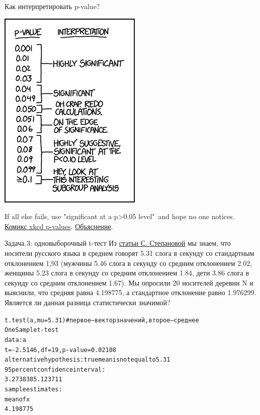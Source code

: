 \begin{frame}{Как интерпретировать p-value?}
\begin{center}
\includegraphics[width=0.45\linewidth]{ifall.png}
\end{center}
\vspace{-5mm}
If all else fails, use "significant at a p>0.05 level"\ and hope no one notices.
\\
\href{https://xkcd.com/1478/}{\alert{Комикс xkcd p-values}}. \href{http://www.explainxkcd.com/wiki/index.php/P-Values}{\alert{Объяснение}}.
\end{frame}
\begin{frame}{Задача 3: одновыборочный t-тест}
Из \href{https://www.internationalphoneticassociation.org/icphs-proceedings/ICPhS2011/OnlineProceedings/RegularSession/Stepanova/Stepanova.pdf}{\alert{статьи С. Степановой}} мы знаем, что носители русского языка в среднем говорят 5.31 слога в секунду со стандартным отклонением 1,93 (мужчины 5.46 слога в секунду  со средним отклонением 2.02, женщины 5.23 слога в секунду  со средним отклонением 1.84, дети 3.86 слога в секунду со средним отклонением 1.67). Мы опросили 20 носителей деревни N и выяснили, что средняя равна 4.198775, а стандартное отклонение равно 1.976299. Является ли данная разница статистически значимой?
\vfill
\scriptsize
\begin{alltt}
\alert{t.test(a, mu = 5.31)} \hfill \# первое — вектор значений, второе — среднее\medskip\\
One Sample t-test\\
data:  a\\
\alert{t = -2.5146, df = 19, p-value = 0.02108}\\
alternative hypothesis: true mean is not equal to 5.31\\
95 percent confidence interval:\\
 3.273838 5.123711\\
sample estimates:\\
mean of x \\
 4.198775 
\end{alltt}
\normalsize
\end{frame}
